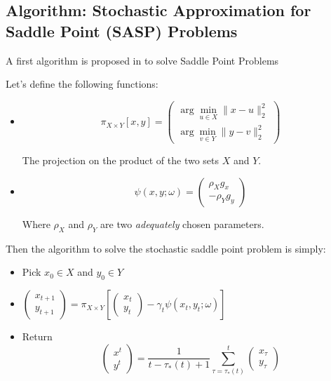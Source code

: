 \documentclass[10pt]{article}
\begin{document}
\subsection{Algorithm: Stochastic Approximation for Saddle Point (SASP) Problems}

A first algorithm is proposed in \cite{NemirovskiRubinstein} to solve Saddle Point Problems


Let's define the following functions:
\begin{itemize}
\item $$\pi_{X \times Y}[x,y] = \begin{pmatrix} \arg\min_{u \in X}\lVert x - u \rVert_{2}^{2} \\ \arg\min_{v \in Y}\lVert y - v \rVert_{2}^{2} \end{pmatrix}$$

The projection on the product of the two sets $X$ and $Y$.

\item $$\psi(x,y;\omega) = \begin{pmatrix} \rho_{X} g_{x} \\ -\rho_{Y} g_{y}  \end{pmatrix}$$

Where $\rho_{X}$ and $\rho_{Y}$ are two \emph{adequately} chosen parameters.

\end{itemize}


\vspace{0.5cm}

Then the algorithm to solve the stochastic saddle point problem is simply:

\vspace{0.5cm}




\begin{itemize}
\item Pick $x_{0} \in X$ and $y_{0} \in Y$
\item $\begin{pmatrix} x_{t+1} \\ y_{t+1} \end{pmatrix} = \pi_{X \times Y}[\begin{pmatrix} x_{t} \\ y_{t} \end{pmatrix} - \gamma_{t}\psi(x_{t},y_{t};\omega)]$
\item Return 
$$
\begin{pmatrix} x^{t} \\ y^{t} \end{pmatrix} = \dfrac{1}{t - \tau_{*}(t) + 1}\sum_{\tau = \tau_{*}(t)}^{t}\begin{pmatrix} x_{\tau} \\ y_{\tau} \end{pmatrix}
$$
\end{itemize}
\end{document}
